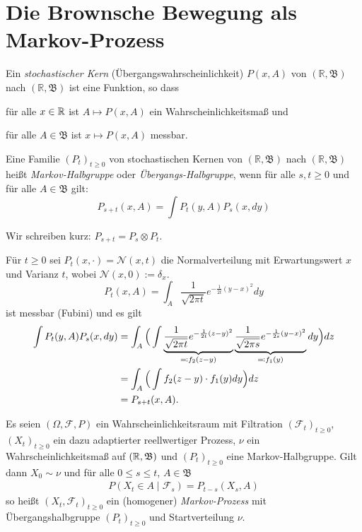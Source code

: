 \documentclass[a4paper,twoside,DIV15,BCOR12mm]{scrbook}
\newcommand{\cF}{\mathcal F}
\newcommand{\borel}{{\mathfrak B}}
\begin{document}
\section{Die Brownsche Bewegung als Markov-Prozess}
\begin{definition}
  Ein \emph{stochastischer Kern} (Übergangswahrscheinlichkeit) $P(x,A)$ von $(\mathbb R, \borel)$ nach $(\mathbb R, \borel)$ ist eine Funktion, so dass
  \begin{enuma}
  \item für alle $x\in \mathbb{R}$ ist $A\mapsto P(x,A)$ ein Wahrscheinlichkeitsmaß und
  \item für alle $A\in\borel$ ist  $x\mapsto P(x,A)$ messbar.
  \end{enuma}
\end{definition}
\begin{definition}
    Eine Familie $(P_t)_{t\geq 0}$ von stochastischen Kernen von $(\mathbb R, \borel)$ nach $(\mathbb R, \borel)$ heißt \emph{Markov-Halbgruppe} oder \emph{Übergangs-Halbgruppe}, wenn für alle $s,t\ge 0$ und für alle $A\in\borel$ gilt:
\[
P_{s+t}(x,A)=\int P_t(y,A)P_s(x,dy)
\]
\end{definition}
\begin{bemerkung}
  Wir schreiben kurz: $P_{s+t}=P_s\otimes P_t$.
\end{bemerkung}
\begin{beispiel}
Für $t\ge 0$ sei $P_t(x,\cdot)=\mathcal N(x,t)$ die Normalverteilung mit Erwartungswert $x$ und Varianz $t$, wobei $\mathcal N(x,0):=\delta_x$.
\[
P_t(x,A) = \int_A \frac1{\sqrt{2\pi t}} e^{-\frac 1{2t}(y-x)^2}dy
\]
ist messbar (Fubini) und es gilt
\begin{align*}
\int P_t(y,A)P_s(x,dy) &= \int_A \Big(\int \underbrace{\frac1{\sqrt{2\pi t}}e^{-\frac1{2t}(z-y)^2}}_{\ad f_2(z-y)} \underbrace{\frac1{\sqrt{2\pi s}} e^{-\frac1{2s} (y-x)^2}}_{\ad f_1(y)} dy \Big) dz \\
&= \int_A\Big(\int f_2(z-y)\cdot f_1(y) dy\Big) dz \\
&= P_{s+t}(x,A).
\end{align*}
\end{beispiel}

\begin{definition}
Es seien $(\Omega, \cF, P)$ ein Wahrscheinlichkeitsraum mit Filtration $(\cF_t)_{t\ge 0}$, $(X_t)_{t\ge 0}$ ein dazu adaptierter reellwertiger Prozess, $\nu$ ein Wahrscheinlichkeitsmaß auf $(\MdR, \borel)$ und $(P_t)_{t\ge 0}$ eine Markov-Halbgruppe. Gilt dann $X_0\sim \nu$ und für alle $0\le s\le t$, $A\in\borel$
\begin{align*}
P(X_t\in A\mid \cF_s) = P_{t-s}(X_s,A)\tag{$*$}
\end{align*}
so heißt $(X_t,\cF_t)_{t\ge 0}$ ein (homogener) \emph{Markov-Prozess}\label{Markov-Prozess!allgemeiner} mit Übergangshalbgruppe $(P_t)_{t\ge 0}$ und Startverteilung $\nu$.
\end{definition}
\end{document}
